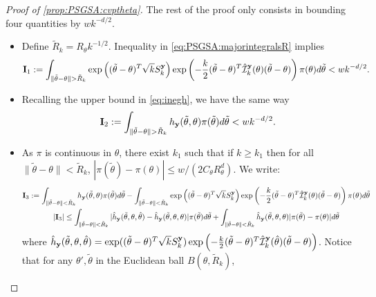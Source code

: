 \begin{proof}[Proof of \cref{prop:PSGSA:cvptheta}]
    The rest of the proof only consists in bounding  four  quantities by $ w k^{-d/2} $.
    \begin{itemize}
        \item Define $\tilde R_k=R_\theta k^{-1/2}$. %
        Inequality in \cref{eq:PSGSA:majorintegralsR} implies
        \begin{equation}
            \mbf I_1 := \int_{\|\tilde\theta-\theta\|>\tilde R_k} \exp\left((\tilde\theta-\theta)^T\sqrt{k}S_k^{\mbf y}\right)\exp\left( -\frac{k}{2}(\tilde\theta-\theta)^T\hat\cI_k^{\mbf y}(\theta)(\tilde\theta-\theta) \right)\pi(\theta)d\tilde\theta < w k^{-d/2}.
        \end{equation}
        \item Recalling the upper bound in \cref{eq:inegh}, we have the same way
            \begin{equation}
                \mbf I_2 := \int_{\|\tilde\theta-\theta\|>\tilde R_k} h_{\mbf y}(\tilde\theta,\theta)\pi(\tilde\theta)d\tilde\theta < w k^{-d/2}.
            \end{equation}
        \item  
        As $\pi$ is continuous in $\theta$, 
        there exist $k_1$ such that if $k\geq k_1$ then for all $\|\tilde\theta-\theta\|<\tilde R_k$, $|\pi(\tilde\theta)-\pi(\theta)|\leq w/(2C_\theta R_\theta^d)$. %
        We write:
            \begin{multline}\label{eq:continuityofHatIk}
               \mbf I_3 := \int_{\|\tilde\theta-\theta\|<\tilde R_k} h_{\mbf y}(\tilde\theta,\theta)\pi(\tilde\theta)d\tilde\theta  
                     - \int_{\|\tilde\theta-\theta\|<\tilde R_k}\exp\left((\tilde\theta-\theta)^T\sqrt{k}S_k^{\mbf y}\right)\exp\left(-\frac{k}{2}(\tilde\theta-\theta)^T\hat\cI_k^{\mbf y}(\theta)(\tilde\theta-\theta)\right)\pi(\theta)d\tilde\theta \\ %
                    |\mbf I_3| \leq \int_{\|\tilde\theta-\theta\|<\tilde R_k}|\hat h_{\mbf y}(\tilde\theta,\theta,\hat\theta) - \hat h_{\mbf y}(\tilde\theta,\theta,\theta) |\pi(\tilde\theta)d\tilde\theta + \int_{\|\tilde\theta-\theta\|<\tilde R_k}\hat h_{\mbf y}(\tilde\theta,\theta,\theta)|\pi(\tilde\theta)-\pi(\theta)|d\tilde\theta
            \end{multline}
        where $\hat h_{\mathbf{y}}(\tilde\theta,\theta,\hat\theta)=\exp((\tilde\theta-\theta)^T\sqrt{k}S_k^{\mathbf{y}})\exp\left(-\frac{k}{2}(\tilde\theta-\theta)^T\hat{\mathcal{I}}_k^{\mathbf{y}}(\hat\theta)(\tilde\theta-\theta)\right)$. {Notice that for any $\theta',\tilde\theta$ in the Euclidean ball $B(\theta,\tilde R_k)$,}

\end{itemize}
\end{proof}
